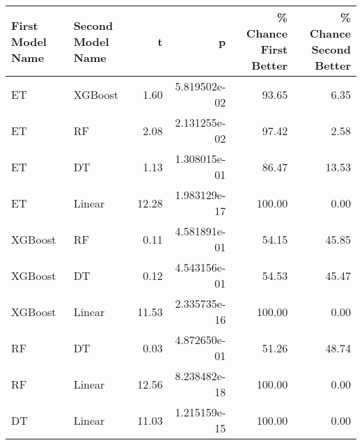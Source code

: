 \begin{tabular}{llrrrr}
\toprule
First Model Name & Second Model Name &     t &            p &  \% Chance First Better &  \% Chance Second Better \\
\midrule
              ET &           XGBoost &  1.60 & 5.819502e-02 &                  93.65 &                    6.35 \\
              ET &                RF &  2.08 & 2.131255e-02 &                  97.42 &                    2.58 \\
              ET &                DT &  1.13 & 1.308015e-01 &                  86.47 &                   13.53 \\
              ET &            Linear & 12.28 & 1.983129e-17 &                 100.00 &                    0.00 \\
         XGBoost &                RF &  0.11 & 4.581891e-01 &                  54.15 &                   45.85 \\
         XGBoost &                DT &  0.12 & 4.543156e-01 &                  54.53 &                   45.47 \\
         XGBoost &            Linear & 11.53 & 2.335735e-16 &                 100.00 &                    0.00 \\
              RF &                DT &  0.03 & 4.872650e-01 &                  51.26 &                   48.74 \\
              RF &            Linear & 12.56 & 8.238482e-18 &                 100.00 &                    0.00 \\
              DT &            Linear & 11.03 & 1.215159e-15 &                 100.00 &                    0.00 \\
\bottomrule
\end{tabular}
